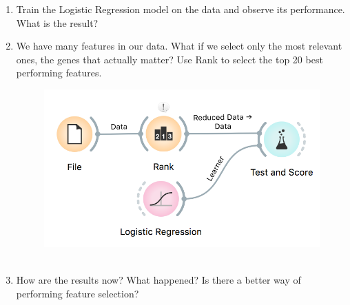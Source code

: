 \begin{enumerate}
    \item Train the Logistic Regression model on the data and observe its performance. What is the result?
    \item We have many features in our data. What if we select only the most relevant ones, the genes that actually matter? Use Rank to select the top 20 best performing features.
    
    \begin{figure}[h]
        \centering
        \includegraphics[scale=0.8]{overfitting2.png}%
        \caption{$\;$}
        \label{fig:wf2}
      \end{figure}

    \item How are the results now? What happened? Is there a better way of performing feature selection?
\end{enumerate}
